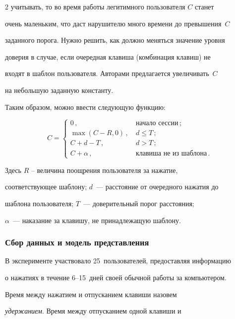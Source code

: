 \begin{multicols}{2}
учитывать, то во время работы легитимного пользователя $C$ станет

очень маленьким, что даст нарушителю много времени до превышения~$C$

заданного порога. Нужно решить, как должно меняться значение уровня

доверия в случае, если очередная клавиша (комбинация клавиш) не

входят в шаблон пользователя. Авторами предлагается увеличивать~$C$

на небольшую заданную константу.



Таким образом, можно ввести следующую функцию:

$$ C =\begin{cases}

    0\,, &\ \mbox{начало\ сессии}\,; \\

    \max(C - R, 0)\,, &\ d \le T\,; \\

    C + d - T\,, &\ d > T\,; \\

    C + \alpha\,, &\ \mbox{клавиша\ не\ из\ шаблона}\,.

\end{cases}

$$

Здесь $R$ -- величина поощрения пользователя за нажатие,

соответствующее шаблону; $d$~--- расстояние от очередного нажатия до

шаблона пользователя; $T$~--- доверительный порог расстояния;

$\alpha$~--- наказание за клавишу, не принадлежащую шаблону.



\subsubsection{Сбор данных и модель представления}



В эксперименте участвовало 25~пользователей, предоставляя информацию

о нажатиях в течение 6--15~дней своей обычной работы за компьютером.



Время между нажатием и отпусканием клавиши назовем

\textit{удержанием}. Время между отпусканием одной клавиши и


\end{multicols}
